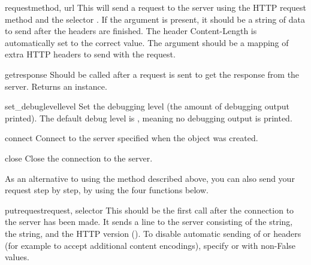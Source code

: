 \begin{methoddesc}{request}{method, url}
This will send a request to the server using the HTTP request method
 and the selector .  If the  argument is
present, it should be a string of data to send after the headers are finished.
The header Content-Length is automatically set to the correct value.
The  argument should be a mapping of extra HTTP headers to send
with the request.
\end{methoddesc}

\begin{methoddesc}{getresponse}{}
Should be called after a request is sent to get the response from the server.
Returns an  instance.
\end{methoddesc}

\begin{methoddesc}{set_debuglevel}{level}
Set the debugging level (the amount of debugging output printed).
The default debug level is , meaning no debugging output is
printed.
\end{methoddesc}

\begin{methoddesc}{connect}{}
Connect to the server specified when the object was created.
\end{methoddesc}

\begin{methoddesc}{close}{}
Close the connection to the server.
\end{methoddesc}

As an alternative to using the  method described above,
you can also send your request step by step, by using the four functions
below.

\begin{methoddesc}{putrequest}{request, selector}
This should be the first call after the connection to the server has
been made.  It sends a line to the server consisting of the
 string, the  string, and the HTTP version
().  To disable automatic sending of  or
 headers (for example to accept additional
content encodings), specify  or 
with non-False values.
\end{methoddesc}

